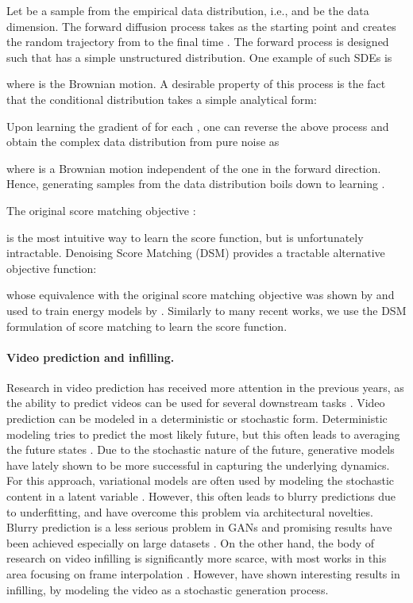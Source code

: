 \documentclass[10pt]{article} \usepackage[accepted]{tmlr}
\begin{document}
Let  be a sample from the empirical data distribution, i.e.,  and  be the data dimension. The forward diffusion process takes  as the starting point and creates the random trajectory  from  to the final time . The forward process is designed such that  has a simple unstructured distribution. One example of such SDEs is

where  is the Brownian motion. A desirable property of this process is the fact that the conditional distribution  takes a simple analytical form:

Upon learning the gradient of  for each , one can reverse the above process and obtain the complex data distribution from pure noise as

where  is a Brownian motion independent of the one in the forward direction. Hence, generating samples from the data distribution boils down to learning . 

The original score matching objective \citep{hyvarinen2005estimation}:

is the most intuitive way to learn the score function, but is unfortunately intractable. Denoising Score Matching (DSM) provides a tractable alternative objective function:

whose equivalence with the original score matching objective was shown by \citet{Vincent2011} and used to train energy models by \citet{saremi2018deep}. Similarly to many recent works, we use the DSM formulation of score matching to learn the score function.


\paragraph{Video prediction and infilling.} Research in video prediction has received more attention in the previous years, as the ability to predict videos can be used for several downstream tasks \citep{opera_2020_review}. Video prediction can be modeled in a deterministic or stochastic form. Deterministic modeling \citep{walker_2015, vondrick_2017, terwilliger_2019, sun_2019} tries to predict the most likely future, but this often leads to averaging the future states \citep{li_2019}. Due to the stochastic nature of the future, generative models have lately shown to be more successful in capturing the underlying dynamics. For this approach, variational models are often used by modeling the stochastic content in a latent variable \citep{babaeizadeh2018stochastic, saxena2021clockwork, pmlr-v80-denton18a, wu_2021_ghvae}. However, this often leads to blurry predictions due to underfitting, and \citet{babaeizadeh2021fitvid} have overcome this problem via architectural novelties. Blurry prediction is a less serious problem in GANs and promising results have been achieved especially on large datasets \citep{clark_2019_dvd_gan, Luc_2020}. 
On the other hand, the body of research on video infilling is significantly more scarce, with most works in this area focusing on frame interpolation \citep{jiang_2017_slomo}. However, \citet{xu_2018} have shown interesting results in infilling, by modeling the video as a stochastic generation process.
\end{document}
